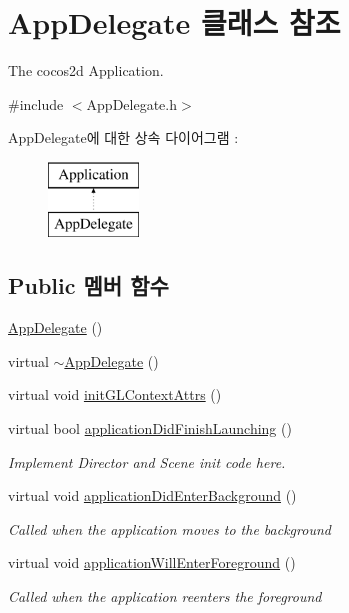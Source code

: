 \hypertarget{class_app_delegate}{}\section{App\+Delegate 클래스 참조}
\label{class_app_delegate}


The cocos2d Application.  




{\ttfamily \#include $<$App\+Delegate.\+h$>$}

App\+Delegate에 대한 상속 다이어그램 \+: \begin{figure}[H]
\begin{center}
\leavevmode
\includegraphics[height=2.000000cm]{class_app_delegate}
\end{center}
\end{figure}
\subsection*{Public 멤버 함수}
\begin{DoxyCompactItemize}
\item 
\hyperlink{class_app_delegate_a7d26ade6fbc9d35ecc9185792303f82d}{App\+Delegate} ()
\item 
virtual \hyperlink{class_app_delegate_a9f89424b5e296e3668deaa0265fc5ac1}{$\sim$\+App\+Delegate} ()
\item 
virtual void \hyperlink{class_app_delegate_a2de4e8ab7d04bde311684e1d4ceb2c0f}{init\+G\+L\+Context\+Attrs} ()
\item 
virtual bool \hyperlink{class_app_delegate_a68cbaed49edf7581dc59a09d5062fff3}{application\+Did\+Finish\+Launching} ()
\begin{DoxyCompactList}\small\item\em Implement Director and Scene init code here. \end{DoxyCompactList}\item 
virtual void \hyperlink{class_app_delegate_a17cb09777419781698324e0415bffd3a}{application\+Did\+Enter\+Background} ()
\begin{DoxyCompactList}\small\item\em Called when the application moves to the background \end{DoxyCompactList}\item 
virtual void \hyperlink{class_app_delegate_ac4d653e3f74a91efef5f2def58fe3108}{application\+Will\+Enter\+Foreground} ()
\begin{DoxyCompactList}\small\item\em Called when the application reenters the foreground \end{DoxyCompactList}\end{DoxyCompactItemize}



